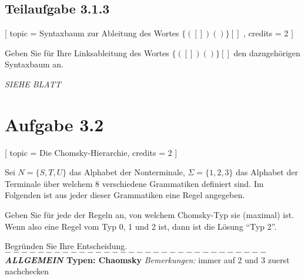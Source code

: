 \documentclass[12pt]{article}
\begin{document}
 \subsection*{Teilaufgabe 3.1.3} [ 
 topic = {Syntaxbaum zur Ableitung des Wortes $\{([])()\}[]$ }, 
 credits = 2 
 ] 
  
 Geben Sie für Ihre Linksableitung des Wortes $\{([])()\}[]$ den dazugehörigen Syntaxbaum an. 
  
\textit{  \emph{SIEHE BLATT}
} \section*{Aufgabe 3.2} [ 
 topic = Die Chomsky-Hierarchie, 
 credits = 2 
 ] 
  
 Sei $N = \{S,T,U\}$ das Alphabet der Nonterminale, $\Sigma = \{1,2,3\}$ das Alphabet der Terminale über welchem 8 verschiedene Grammatiken definiert sind. Im Folgenden ist aus jeder dieser Grammatiken eine Regel angegeben.  
  
 Geben Sie für jede der Regeln an, von welchem Chomsky-Typ sie (maximal) ist. Wenn also eine Regel vom Typ 0, 1 und 2 ist, dann ist die Lösung "`Typ 2"'. 
  
 Begründen Sie Ihre Entscheidung.  \\
  $--------------------------------$
\textbf{\textit{ALLGEMEIN} Typen: Chaomsky
}
 \textit{Bemerkungen:} immer auf 2 und 3 zuerst nachchecken
\end{document}
